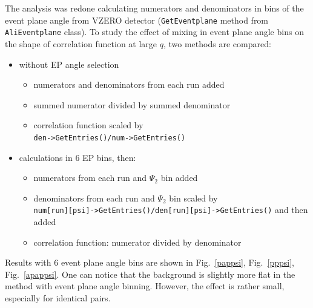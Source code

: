 The analysis was redone calculating numerators and denominators in bins of the event plane angle from VZERO detector (\verb|GetEventplane| method from \verb|AliEventplane| class). To study the effect of mixing in event plane angle bins on the shape of correlation function at large $q$, two methods are compared:
\begin{itemize}
\item without EP angle selection
  \begin{itemize}
  \item numerators and denominators from each run added
  \item summed numerator divided by summed denominator
  \item correlation function scaled by \\ \verb|den->GetEntries()/num->GetEntries()|
  \end{itemize}
\item calculations in 6 EP bins, then:
  \begin{itemize}
  \item numerators from each run and $\Psi_2$ bin added
  \item denominators from each run and $\Psi_2$ bin scaled by \\ \verb|num[run][psi]->GetEntries()/den[run][psi]->GetEntries()| and then added
  \item correlation function: numerator divided by denominator
  \end{itemize}
\end{itemize}
Results with 6 event plane angle bins are shown in Fig.~\ref{pappsi}, Fig.~\ref{pppsi}, Fig.~\ref{apappsi}. One can notice that the background is slightly more flat in the method with event plane angle binning. However, the effect is rather small, especially for identical pairs.

